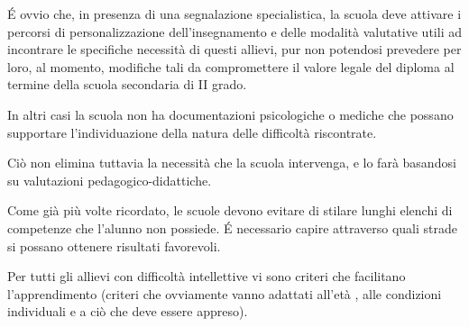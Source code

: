 \begin{description}
\begin{enumerate}
\begin{description}
 		\'{E} ovvio che, in presenza di una segnalazione specialistica, la scuola deve attivare i percorsi di
 		personalizzazione dell'insegnamento e delle modalità valutative utili ad incontrare le specifiche
 		necessità di questi allievi, pur non potendosi prevedere per loro, al momento, modifiche tali da
 		compromettere il valore legale del diploma al termine della scuola secondaria di II grado.
 		
 		In altri casi la scuola non ha documentazioni psicologiche o mediche che possano supportare
 		l'individuazione della natura delle difficoltà riscontrate.
 		
 		Ciò non elimina tuttavia la necessità che la scuola intervenga, e lo farà basandosi su valutazioni
 		pedagogico-didattiche.
 		
 		Come già più volte ricordato, le scuole devono evitare di stilare lunghi elenchi di competenze che
 		l'alunno non possiede. \'{E} necessario capire attraverso quali strade si possano ottenere risultati
 		favorevoli.
 		
 		Per tutti gli allievi con difficoltà intellettive vi sono criteri che facilitano l'apprendimento (criteri che
 		ovviamente vanno adattati all'età , alle condizioni individuali e a ciò che deve essere appreso).
 		

\end{description}
\end{enumerate}
\end{description}

